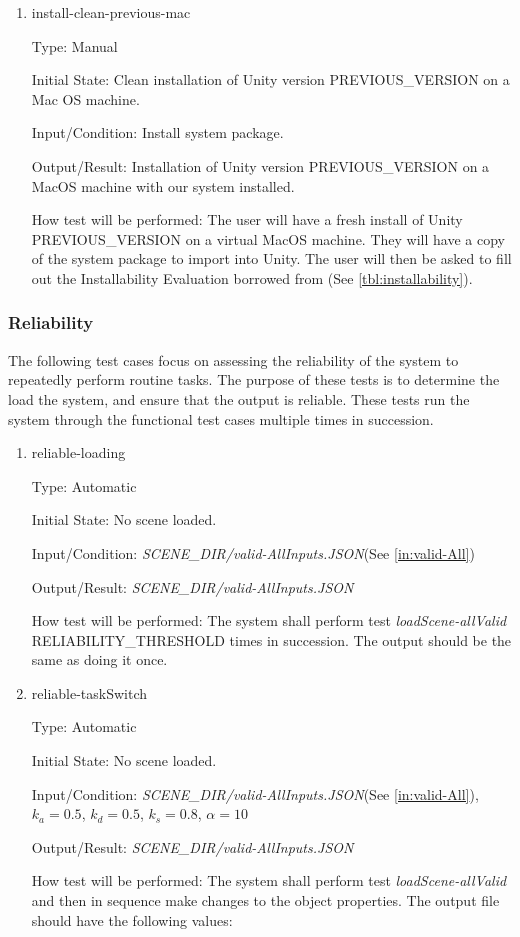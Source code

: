 \documentclass[12pt, titlepage]{article}
\begin{document}
\begin{enumerate}
\item{install-clean-previous-mac\\}

Type: Manual

Initial State: Clean installation of Unity version PREVIOUS\_VERSION on a Mac 
OS machine.

Input/Condition: Install system package.

Output/Result: Installation of Unity version PREVIOUS\_VERSION on a 
MacOS machine with our system installed.

How test will be performed: The user will have a fresh install of Unity 
PREVIOUS\_VERSION on a virtual MacOS machine. They will have a copy of the 
system package to import into Unity. The user will then be asked to fill out 
the Installability Evaluation borrowed from \cite{SmithEtAl2018} (See 
\ref{tbl:installability}).

\end{enumerate}

\subsubsection{Reliability}
The following test cases focus on assessing the reliability of the system to 
repeatedly perform routine tasks. The purpose of these tests is to determine 
the load the system, and ensure that the output is reliable. These tests run 
the system through the functional test cases multiple times in succession.

\begin{enumerate}
	
	\item{reliable-loading\\}
	
	Type: Automatic
	
	Initial State: No scene loaded.
	
	Input/Condition: \textit{SCENE\_DIR/valid-AllInputs.JSON}(See 
	\ref{in:valid-All})
	
	Output/Result: \textit{SCENE\_DIR/valid-AllInputs.JSON}
	
	How test will be performed: The system shall perform test 
	\textit{loadScene-allValid} RELIABILITY\_THRESHOLD times in succession. The 
	output should be the same as doing it once.

	\item{reliable-taskSwitch\\}
	
	Type: Automatic
	
	Initial State: No scene loaded.
	
	Input/Condition: \textit{SCENE\_DIR/valid-AllInputs.JSON}(See 
	\ref{in:valid-All}), $k_{a} = 0.5$, 
	$k_{d} = 0.5$, $k_{s} = 0.8$, $\alpha = 10$
	
	Output/Result: \textit{SCENE\_DIR/valid-AllInputs.JSON}
	
	How test will be performed: The system shall perform test 
	\textit{loadScene-allValid} and then in sequence make changes to the object 
	properties. The output file should have the following values:

\end{enumerate}
\end{document}
